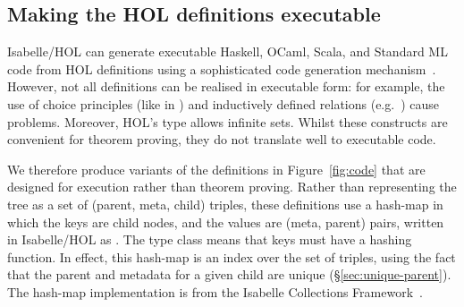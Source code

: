 \documentclass[sigplan,anonymous]{acmart}
\begin{document}
\subsection{Making the HOL definitions executable} \label{subsect.extracting}

Isabelle/HOL can generate executable Haskell, OCaml, Scala, and Standard ML code from HOL definitions using a sophisticated code generation mechanism~\cite{DBLP:conf/flops/HaftmannN10}.
However, not all definitions can be realised in executable form: for example, the use of choice principles (like in ) and inductively defined relations (e.g.\ ) cause problems.
Moreover, HOL's  type allows infinite sets.
Whilst these constructs are convenient for theorem proving, they do not translate well to executable code.

We therefore produce variants of the definitions in Figure~\ref{fig:code} that are designed for execution rather than theorem proving.
Rather than representing the tree as a set of (parent, meta, child) triples, these definitions use a hash-map in which the keys are child nodes, and the values are (meta, parent) pairs, written in Isabelle/HOL as .
The  type class means that keys must have a hashing function.
In effect, this hash-map is an index over the set of triples, using the fact that the parent and metadata for a given child are unique (\S\ref{sec:unique-parent}).
The hash-map implementation is from the Isabelle Collections Framework~\cite{DBLP:conf/itp/LammichL10}.
\end{document}
